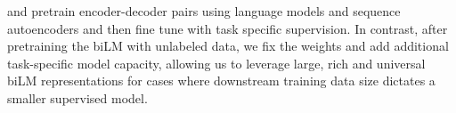 \documentclass[11pt,a4paper]{article}
\begin{document}

\citet{Dai2015SemisupervisedSL} and \citet{Ramachandran2017ImproveSeq2SeqLMGal2016ATG} pretrain encoder-decoder pairs
using language models and sequence autoencoders 
and then fine tune with task specific supervision.
In contrast, after pretraining the biLM with unlabeled data, we fix the weights and add additional task-specific model capacity, allowing us to leverage large, rich and universal biLM representations for cases where downstream training data size dictates a smaller supervised model.



\end{document}
